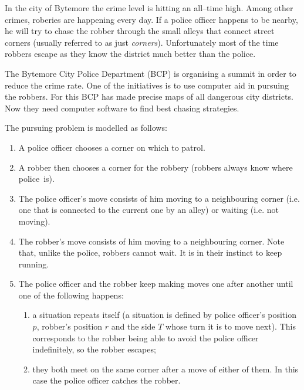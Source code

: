 \documentclass{boi2014}
\begin{document}
    In the city of Bytemore the crime level is hitting an all--time high.  Among
    other crimes, roberies are happening every day.  If a police officer happens
    to be nearby, he will try to chase the robber through the small alleys that
    connect street corners (usually referred to as just \emph{corners}).
    Unfortunately most of the time robbers escape as they know the district much
    better than the police.

    The Bytemore City Police Department (BCP) is organising a summit in order to
    reduce the crime rate. One of the initiatives is to use computer aid in
    pursuing the robbers. For this BCP has made precise maps of all dangerous
    city districts. Now they need computer software to find best chasing
    strategies.

    The pursuing problem is modelled as follows:
    \begin{enumerate}
        \item A police officer chooses a corner on which to patrol.
        \item A robber then chooses a corner for the robbery (robbers always
        know where police~is).
        \item The police officer's move consists of him moving to a neighbouring
        corner (i.e. one that is connected to the current one by an alley) or
        waiting (i.e. not moving).
        \item The robber's move consists of him moving to a neighbouring corner.
        Note that, unlike the police, robbers cannot wait. It is in
        their instinct to keep running.
        \item The police officer and the robber keep making moves one after
        another until one of the following happens:
        \begin{enumerate}
            \item a situation repeats itself (a situation is defined by police
            officer's position $p$, robber's position $r$ and the side $T$ whose
            turn it is to move next). This corresponds to the robber being able
            to avoid the police officer indefinitely, so the robber escapes;
            \item they both meet on the same corner after a move of either of
            them. In this case the police officer catches the robber.
        \end{enumerate}
    \end{enumerate}
\end{document}
